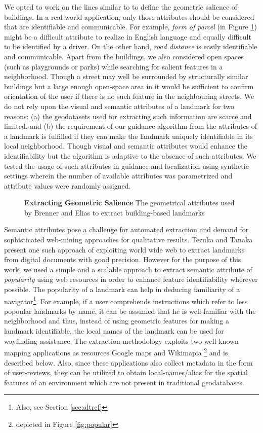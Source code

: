 \documentclass{iitkthesis}
\begin{document}
We opted to work on the lines similar to \cite{brenner} to define the geometric salience of buildings. In a real-world application, only those attributes should be considered that are identifiable and communicable. For example, \textit{form of parcel} (in Figure \ref{fig:elias}) might be a difficult attribute to realize in English language and equally difficult to be identified by a driver. On the other hand, \textit{road distance} is easily identifiable and communicable. Apart from the buildings, we also considered open spaces (such as playgrounds or parks) while searching for salient features in a neighborhood. Though a street may well be surrounded by structurally similar buildings but a large enough open-space area in it would be sufficient to confirm orientation of the user if there is no such feature in the neighbouring streets. We do not rely upon the visual and semantic attributes of a landmark for two reasons: (a) the geodatasets used for extracting such information are scarce and limited, and (b) the requirement of our guidance algorithm from the attributes of a landmark is fulfilled if they can make the landmark uniquely identifiable in its local neighborhood. Though visual and semantic attributes would enhance the identifiability but the algorithm is adaptive to the absence of such attributes. We tested the usage of such attributes in guidance and localization using synthetic settings wherein the number of available attributes was parametrized and attribute values were randomly assigned.

\begin{figure}
\centering
{}
\caption{\textbf{Extracting Geometric Salience} The geometrical attributes used by Brenner and Elias \cite{brenner} to extract building-based landmarks}
\label{fig:elias}
 \end{figure}

Semantic attributes pose a challenge for automated extraction and demand for sophisticated web-mining approaches for qualitative results. Tezuka and Tanaka \cite{tezuka} present one such approach of exploiting world wide web to extract landmarks from digital documents with good precision. However for the purpose of this work, we used a simple and a scalable approach to extract semantic attribute of \textit{popularity} using web resources in order to enhance feature identifiability wherever possible. The popularity of a landmark can help in deducing familiarity of a navigator\footnote{Also, see Section \ref{sec:altref}}. For example, if a user comprehends instructions which refer to less popoular landmarks by name, it can be assumed that he is well-familiar with the neighborhood and thus, instead of using geometric features for making a landmark identifiable, the local names of the landmark can be used for wayfinding assistance. The extraction methodology exploits two well-known mapping applications as resources Google maps \cite{gmaps} and Wikimapia \cite{wiki}\footnote{depicted in Figure \ref{fig:popular}} and is described below.  Also, since these applications also collect metadata in the form of user-reviews, they can be utilized to obtain local-names/alias for the spatial features of an environment which are not present in traditional geodatabases.
\end{document}
